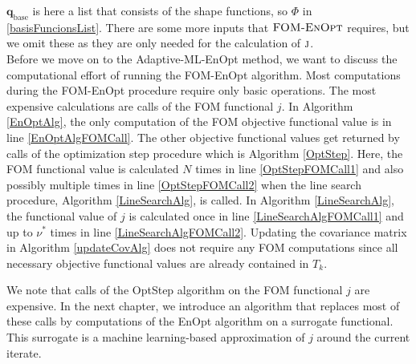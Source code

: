 $\mathbf{q}_\mathrm{base}$ is here a list that consists of the shape functions, so $\Phi$ in \eqref{basisFuncionsList}. There are some more inputs that $\textproc{FOM-EnOpt}$ requires, but we omit these as they are only needed for the calculation of $\textproc{j}$.\\

Before we move on to the Adaptive-ML-EnOpt method, we want to discuss the computational effort of running the FOM-EnOpt algorithm. Most computations during the FOM-EnOpt procedure require only basic operations. The most expensive calculations are calls of the FOM functional $j$. In Algorithm \ref{EnOptAlg}, the only computation of the FOM objective functional value is in line \ref{EnOptAlgFOMCall}. The other objective functional values get returned by calls of the optimization step procedure which is Algorithm \ref{OptStep}. Here, the FOM functional value is calculated $N$ times in line \ref{OptStepFOMCall1} and also possibly multiple times in line \ref{OptStepFOMCall2} when the line search procedure, Algorithm \ref{LineSearchAlg}, is called. In Algorithm \ref{LineSearchAlg}, the functional value of $j$ is calculated once in line \ref{LineSearchAlgFOMCall1} and up to $\nu^*$ times in line \ref{LineSearchAlgFOMCall2}. Updating the covariance matrix in Algorithm \ref{updateCovAlg} does not require any FOM computations since all necessary objective functional values are already contained in $T_k$.

We note that calls of the OptStep algorithm on the FOM functional $j$ are expensive. In the next chapter, we introduce an algorithm that replaces most of these calls by computations of the EnOpt algorithm on a surrogate functional. This surrogate is a machine learning-based approximation of $j$ around the current iterate.